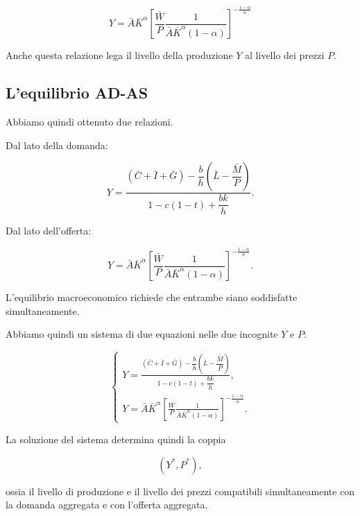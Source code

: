 \begin{equation}
Y
=
\bar{A}\bar{K}^{\alpha}
\left[
\frac{\bar{W}}{P}
\frac{1}{
\bar{A}\bar{K}^{\alpha}(1-\alpha)
}
\right]^{-\frac{1-\alpha}{\alpha}}
\label{eq:AS}
\end{equation}

Anche questa relazione lega il livello della produzione $Y$ al
livello dei prezzi $P$.


\subsection{L'equilibrio AD-AS}

Abbiamo quindi ottenuto due relazioni.

Dal lato della domanda:

\begin{equation*}
Y=
\frac{
(\bar{C}+\bar{I}+\bar{G})
-\dfrac{b}{h}
\left(
\bar{L}-\dfrac{\bar{M}}{P}
\right)
}{
1-c(1-t)+\dfrac{bk}{h}
}.
\end{equation*}

Dal lato dell'offerta:

\begin{equation*}
Y
=
\bar{A}\bar{K}^{\alpha}
\left[
\frac{\bar{W}}{P}
\frac{1}{
\bar{A}\bar{K}^{\alpha}(1-\alpha)
}
\right]^{-\frac{1-\alpha}{\alpha}}.
\end{equation*}

L'equilibrio macroeconomico richiede che entrambe siano soddisfatte
simultaneamente.

Abbiamo quindi un sistema di due equazioni nelle due incognite
$Y$ e $P$:

\begin{equation*}
\begin{cases}
\displaystyle
Y=
\frac{
(\bar{C}+\bar{I}+\bar{G})
-\dfrac{b}{h}
\left(
\bar{L}-\dfrac{\bar{M}}{P}
\right)
}{
1-c(1-t)+\dfrac{bk}{h}
},
\\[5mm]
\displaystyle
Y
=
\bar{A}\bar{K}^{\alpha}
\left[
\frac{\bar{W}}{P}
\frac{1}{
\bar{A}\bar{K}^{\alpha}(1-\alpha)
}
\right]^{-\frac{1-\alpha}{\alpha}}.
\end{cases}
\label{eq:adas_system}
\end{equation*}

La soluzione del sistema determina quindi la coppia

\begin{equation*}
    (Y^*,P^*),
\end{equation*}

ossia il livello di produzione e il livello dei prezzi compatibili
simultaneamente con la domanda aggregata e con l'offerta aggregata.


